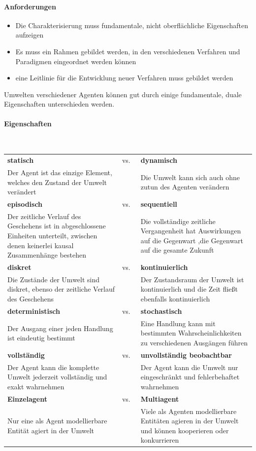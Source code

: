\paragraph{Anforderungen}
\begin{itemize}
	\item Die Charakterisierung muss fundamentale, nicht oberflächliche Eigenschaften aufzeigen
	\item Es muss ein Rahmen gebildet werden, in den verschiedenen Verfahren und Paradigmen eingeordnet werden können
	\item eine Leitlinie für die Entwicklung neuer Verfahren muss gebildet werden
\end{itemize}
Umwelten verschiedener Agenten können gut durch einige fundamentale, duale Eigenschaften unterschieden werden.
\paragraph{Eigenschaften} \mbox{}
\vspace{1em} \\
\begin{tabular}{p{} p{} p{}}
\textbf{statisch} & \centering vs.\ & \textbf{dynamisch}\\
Der Agent ist das einzige Element, welches den Zustand der Umwelt verändert
& &
Die Umwelt kann sich auch ohne zutun des Agenten verändern
\\
\textbf{episodisch} & \centering vs.\ & \textbf{sequentiell}\\
Der zeitliche Verlauf des Geschehens  ist in abgeschlossene Einheiten unterteilt, zwischen denen keinerlei kausal Zusammenhänge bestehen
& &
Die vollständige zeitliche Vergangenheit hat Auswirkungen auf die Gegenwart ,die Gegenwart auf die gesamte Zukunft
\\
\textbf{diskret} & \centering vs.\ & \textbf{kontinuierlich}\\
Die Zustände der Umwelt sind diskret, ebenso der zeitliche Verlauf des Geschehens
& &
Der Zustandsraum der Umwelt ist kontinuierlich und die Zeit fließt ebenfalls kontinuierlich
\\
\textbf{deterministisch} & \centering vs.\ & \textbf{stochastisch}\\
Der Ausgang einer jeden Handlung ist eindeutig bestimmt
& &
Eine Handlung kann mit bestimmten Wahrscheinlichkeiten zu verschiedenen Ausgängen führen
\\
\textbf{vollständig} & \centering vs.\ & \textbf{unvollständig beobachtbar}\\
Der Agent kann die komplette Umwelt jederzeit vollständig und exakt wahrnehmen
& &
Der Agent kann die Umwelt nur eingeschränkt und fehlerbehaftet wahrnehmen
\\
\textbf{Einzelagent} & \centering vs.\ & \textbf{Multiagent}\\
Nur eine als Agent modellierbare Entität agiert in der Umwelt
& &
Viele als Agenten modellierbare Entitäten agieren in der Umwelt und können kooperieren oder konkurrieren
\end{tabular}

